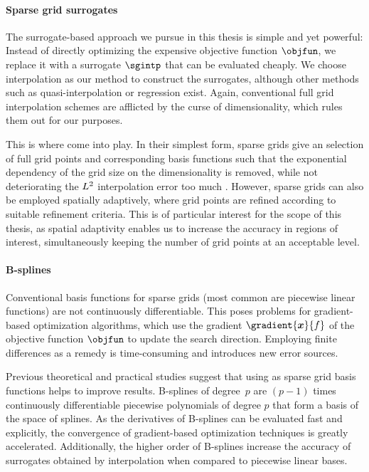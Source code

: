 \paragraph{Sparse grid surrogates}

The surrogate-based approach we pursue in this thesis is simple and
yet powerful:
Instead of directly optimizing the expensive objective function $\objfun$,
we replace it with a surrogate $\sgintp$ that can be evaluated cheaply.
We choose interpolation as our method to construct the surrogates,
although other methods such as quasi-interpolation
\cite{Hoellig13Approximation} or regression \cite{Pflueger10Spatially} exist.
Again, conventional full grid interpolation schemes are afflicted by the
curse of dimensionality, which rules them out for our purposes.

This is where  come into play.
In their simplest form, sparse grids give an  selection of
full grid points and corresponding basis functions such that
the exponential dependency of the grid size on the dimensionality
is removed, while not deteriorating the $L^2$ interpolation error too much
\cite{Bungartz04Sparse}.
However, sparse grids can also be employed spatially adaptively,
where grid points are refined  according to suitable
refinement criteria.
This is of particular interest for the scope of this thesis,
as spatial adaptivity enables us to increase the
accuracy in regions of interest,
simultaneously keeping the number of grid points at an acceptable level.

\paragraph{B-splines}

Conventional basis functions for sparse grids
(most common are piecewise linear functions)
are not continuously differentiable.
This poses problems for gradient-based optimization algorithms,
which use the gradient $\gradient{\*x}{f}$ of the
objective function $\objfun$ to update the search direction.
Employing finite differences as a remedy
is time-consuming and introduces new error sources.

Previous theoretical \cite{Sickel11Spline} and practical
 studies suggest that
using 
as sparse grid basis functions helps to improve results.
B-splines of degree~$p$ are $(p-1)$ times continuously differentiable
piecewise polynomials of degree $p$ that form a basis of the space of splines.
As the derivatives of B-splines can be evaluated fast and explicitly,
the convergence of gradient-based optimization techniques is
greatly accelerated.
Additionally, the higher order of B-splines increase the accuracy
of surrogates obtained by interpolation
when compared to piecewise linear bases.

